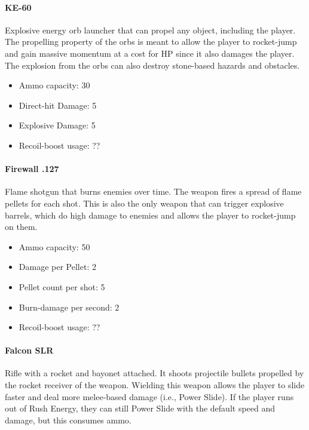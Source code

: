 \documentclass[12pt]{article}
\begin{document}
\paragraph{KE-60}

Explosive energy orb launcher that can propel any object, including the player. The propelling property of the orbs is meant to allow the player to rocket-jump and gain massive momentum at a cost for HP since it also damages the player. The explosion from the orbs can also destroy stone-based hazards and obstacles. 

\begin{itemize}
	\item Ammo capacity: 30
	\item Direct-hit Damage: 5
	\item Explosive Damage: 5
	\item Recoil-boost usage: ??
\end{itemize} 


\paragraph{Firewall .127}

Flame shotgun that burns enemies over time. The weapon fires a spread of flame pellets for each shot. This is also the only weapon that can trigger explosive barrels, which do high damage to enemies and allows the player to rocket-jump on them. 

\begin{itemize}
	\item Ammo capacity: 50
	\item Damage per Pellet: 2
	\item Pellet count per shot: 5
	\item Burn-damage per second: 2
	\item Recoil-boost usage: ??
\end{itemize} 

\paragraph{Falcon SLR}

Rifle with a rocket and bayonet attached. It shoots projectile bullets propelled by the rocket receiver of the weapon. Wielding this weapon allows the player to slide faster and deal more melee-based damage (i.e., Power Slide). If the player runs out of Rush Energy, they can still Power Slide with the default speed and damage, but this consumes ammo. 
\end{document}
